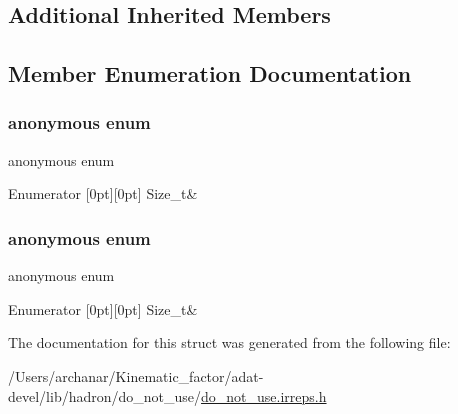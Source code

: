 \subsection*{Additional Inherited Members}


\subsection{Member Enumeration Documentation}
\mbox{\label{structHadron_1_1NonZeroHelicityRep_a6541fdf7de0001acfe09785a544da322}} 
\subsubsection{\texorpdfstring{anonymous enum}{anonymous enum}}
{\footnotesize\ttfamily anonymous enum}

\begin{DoxyEnumFields}{Enumerator}
[0pt][0pt]{}\mbox{\label{structHadron_1_1NonZeroHelicityRep_a6541fdf7de0001acfe09785a544da322a338746418526945503f92c6286bcc416}} 
Size\+\_\+t&\\
\hline

\end{DoxyEnumFields}
\mbox{\label{structHadron_1_1NonZeroHelicityRep_abc40c6d13da7a2f80fe443e54059ca9b}} 
\subsubsection{\texorpdfstring{anonymous enum}{anonymous enum}}
{\footnotesize\ttfamily anonymous enum}

\begin{DoxyEnumFields}{Enumerator}
[0pt][0pt]{}\mbox{\label{structHadron_1_1NonZeroHelicityRep_a6541fdf7de0001acfe09785a544da322a338746418526945503f92c6286bcc416}} 
Size\+\_\+t&\\
\hline

\end{DoxyEnumFields}


The documentation for this struct was generated from the following file\+:\begin{DoxyCompactItemize}
\item 
/\+Users/archanar/\+Kinematic\+\_\+factor/adat-\/devel/lib/hadron/do\+\_\+not\+\_\+use/\mbox{\hyperlink{adat-devel_2lib_2hadron_2do__not__use_2do__not__use_8irreps_8h}{do\+\_\+not\+\_\+use.\+irreps.\+h}}\end{DoxyCompactItemize}
